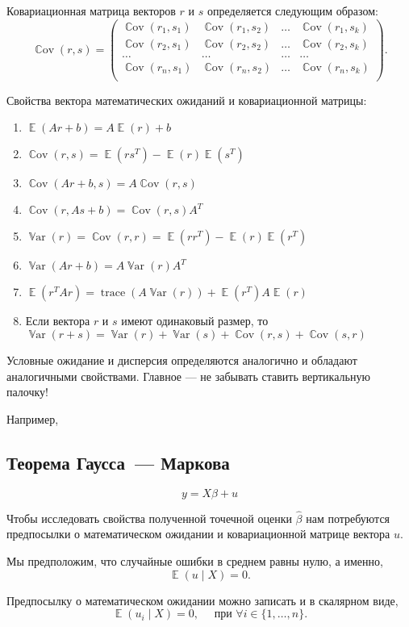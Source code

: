 \documentclass[12pt]{article}
\DeclareMathOperator{\Cov}{\mathbb{C}ov}
\DeclareMathOperator{\Var}{\mathbb{V}ar}
\DeclareMathOperator{\E}{\mathbb{E}}
\DeclareMathOperator{\trace}{trace}
\renewcommand{\b}{\beta}
\newcommand{\hb}{\hat{\beta}}
\renewcommand{\u}{u}
\begin{document}
Ковариационная матрица векторов $r$ и $s$ определяется следующим образом:
\[
\Cov(r,s) = \begin{pmatrix}
	\Cov(r_1,s_1) & \Cov(r_1,s_2) & \dots & \Cov(r_1,s_k) \\
	\Cov(r_2,s_1) & \Cov(r_2,s_2) & \dots & \Cov(r_2,s_k) \\
        \dots & \dots & \dots & \dots\\
        \Cov(r_n,s_1) & \Cov(r_n,s_2) & \dots & \Cov(r_n,s_k) \\
      \end{pmatrix}.
\]

Свойства вектора математических ожиданий и ковариационной матрицы:
\begin{enumerate}
    \item $\E(Ar+b) = A\E(r)+b$
    \item $\Cov(r,s) = \E(rs^T)-\E(r)\E(s^T)$
    \item $\Cov(Ar+b,s) = A\Cov(r,s)$
    \item $\Cov(r,As+b) = \Cov(r,s)A^T$
    \item $\Var(r)=\Cov(r,r) = \E(rr^T)-\E(r)\E(r^T)$
    \item $\Var(Ar+b) = A\Var(r)A^T$
    \item $\E(r^T Ar) = \trace(A\Var(r))+\E(r^T) A\E(r)$  
    \item Если вектора $r$ и $s$ имеют одинаковый размер, то
    $\Var(r + s) = \Var(r) + \Var(s) + \Cov(r, s) + \Cov(s, r)$
\end{enumerate}

Условные ожидание и дисперсия определяются аналогично и обладают аналогичными свойствами.
Главное — не забывать ставить вертикальную палочку!

Например, 



\subsection{Теорема Гаусса~— Маркова}

\[y = X\b + u\]

Чтобы исследовать свойства полученной точечной оценки $\hb$ нам потребуются предпосылки о математическом ожидании и ковариационной матрице вектора $\u$.

Мы предположим, что случайные ошибки в среднем равны нулю, а именно,
\[
\E(\u \mid X) = 0.
\]


Предпосылку о математическом ожидании можно записать и в скалярном виде,
\[
\E(\u_i \mid X) = 0, \quad \text{ при } \forall i \in \{1, \dots, n\}.
\]
\end{document}
